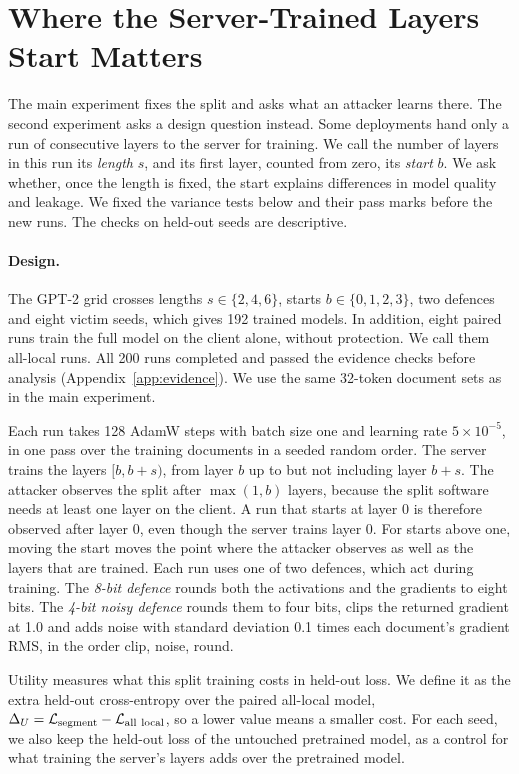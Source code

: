 \documentclass[11pt]{article}
\begin{document}
\section{Where the Server-Trained Layers Start Matters}
\label{sec:p6}
The main experiment fixes the split and asks what an attacker learns there. The second experiment asks a design question instead. Some deployments hand only a run of consecutive layers to the server for training. We call the number of layers in this run its \emph{length} $s$, and its first layer, counted from zero, its \emph{start} $b$. We ask whether, once the length is fixed, the start explains differences in model quality and leakage. We fixed the variance tests below and their pass marks before the new runs. The checks on held-out seeds are descriptive.

\paragraph{Design.}
The GPT-2 grid crosses lengths $s\in\{2,4,6\}$, starts $b\in\{0,1,2,3\}$, two defences and eight victim seeds, which gives 192 trained models. In addition, eight paired runs train the full model on the client alone, without protection. We call them all-local runs. All 200 runs completed and passed the evidence checks before analysis (Appendix~\ref{app:evidence}). We use the same 32-token document sets as in the main experiment.

Each run takes 128 AdamW \cite{loshchilov2019adamw} steps with batch size one and learning rate $5\times10^{-5}$, in one pass over the training documents in a seeded random order. The server trains the layers $[b,b+s)$, from layer $b$ up to but not including layer $b+s$. The attacker observes the split after $\max(1,b)$ layers, because the split software needs at least one layer on the client. A run that starts at layer 0 is therefore observed after layer 0, even though the server trains layer 0. For starts above one, moving the start moves the point where the attacker observes as well as the layers that are trained. Each run uses one of two defences, which act during training. The \emph{8-bit defence} rounds both the activations and the gradients to eight bits. The \emph{4-bit noisy defence} rounds them to four bits, clips the returned gradient at 1.0 and adds noise with standard deviation 0.1 times each document's gradient RMS, in the order clip, noise, round.

Utility measures what this split training costs in held-out loss. We define it as the extra held-out cross-entropy over the paired all-local model, $\Delta_U=\mathcal L_{\rm segment}-\mathcal L_{\rm all\ local}$, so a lower value means a smaller cost. For each seed, we also keep the held-out loss of the untouched pretrained model, as a control for what training the server's layers adds over the pretrained model.
\end{document}
